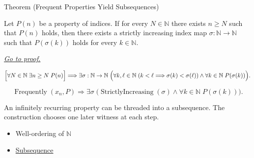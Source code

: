 
\begin{theorembox}{Theorem (Frequent Properties Yield Subsequences)}
\begin{theorem}
\label{thm:frequent-properties-yield-subsequences}
Let $P(n)$ be a property of indices. If for every $N\in\mathbb{N}$ there
exists $n\ge N$ such that $P(n)$ holds, then there exists a strictly
increasing index map $\sigma:\mathbb{N}\to\mathbb{N}$ such that
$P(\sigma(k))$ holds for every $k\in\mathbb{N}$.

\smallskip
\noindent
\hyperref[prf:frequent-properties-yield-subsequences]{\textit{Go to proof.}}
\end{theorem}
\end{theorembox}

\begin{remark*}
\[
\Bigl[
\forall N\in\mathbb{N}\;\exists n\ge N\;P(n)
\Bigr]
\Longrightarrow
\exists \sigma:\mathbb{N}\to\mathbb{N}\;
\Bigl(
  \forall k,\ell\in\mathbb{N}\;(k<\ell\Longrightarrow\sigma(k)<\sigma(\ell))
  \land
  \forall k\in\mathbb{N}\;P(\sigma(k))
\Bigr).
\]
\end{remark*}

\begin{remark*}
\[
\operatorname{Frequently}(x_n,P)
\Longrightarrow
\exists \sigma\;\bigl(\operatorname{StrictlyIncreasing}(\sigma)
\land
\forall k\in\mathbb{N}\;P(\sigma(k))\bigr).
\]
\end{remark*}

\begin{remark*}[Interpretation]
An infinitely recurring property can be threaded into a subsequence. The
construction chooses one later witness at each step.
\end{remark*}

\begin{dependencies}
\begin{itemize}
  \item Well-ordering of $\mathbb{N}$
  \item \hyperref[def:subsequence]{Subsequence}
\end{itemize}
\end{dependencies}


